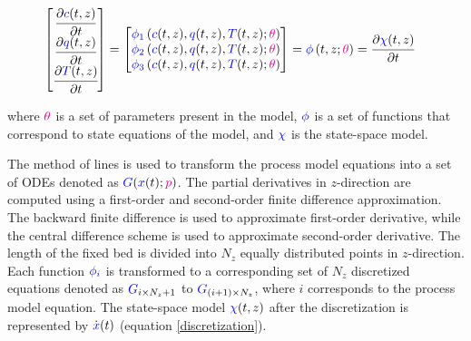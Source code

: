 \documentclass[../Article_Model_Parameters.tex]{subfiles}
\begin{document}
		{\footnotesize
			\begin{align}
				\begin{bmatrix}
					\cfrac{\partial {\color{blue}c}(t,z)}{\partial t}\\
					\cfrac{\partial {\color{blue}q}(t,z)}{\partial t}\\
					\cfrac{\partial {\color{blue}T}(t,z)}{\partial t} 
				\end{bmatrix}
				& =
				\begin{bmatrix}
					{\color{blue}\phi_1} \left( {\color{blue}c}(t,z),{\color{blue}q}(t,z),{\color{blue}T}(t,z); {\color{magenta}\theta} \right)\\
					{\color{blue}\phi_2} \left( {\color{blue}c}(t,z),{\color{blue}q}(t,z),{\color{blue}T}(t,z); {\color{magenta}\theta} \right)\\
					{\color{blue}\phi_3} \left( {\color{blue}c}(t,z),{\color{blue}q}(t,z),{\color{blue}T}(t,z); {\color{magenta}\theta} \right)
				\end{bmatrix} = {\color{blue}\phi} \left( t,z; {\color{magenta}\theta} \right) = \cfrac{\partial {\color{blue}\chi}(t,z)}{\partial t}
		\end{align} }
			
		where ${\color{magenta}\theta}$ is a set of parameters present in the model, ${\color{blue}\phi}$ is a set of functions that correspond to state equations of the model, and ${\color{blue}\chi}$ is the state-space model.
		
		The method of lines is used to transform the process model equations into a set of ODEs denoted as ${\color{blue}G}({\color{blue}x}(t);{\color{magenta}p})$. The partial derivatives in $z$-direction are computed using a first-order and second-order finite difference approximation. The backward finite difference is used to approximate first-order derivative, while the central difference scheme is used to approximate second-order derivative. The length of the fixed bed is divided into $N_z$ equally distributed points in $z$-direction. Each function ${\color{blue}\phi_i}$ is transformed to a corresponding set of $N_z$ discretized equations denoted as ${\color{blue}G}_{i\times N_z+1}$ to ${\color{blue}G}_{(i+1)\times N_z}$, where $i$ corresponds to the process model equation. The state-space model ${\color{blue}\chi}(t,z)$ after the discretization is represented by $\dot{{\color{blue}x}}(t)$ (equation  \ref{discretization}).
			
\end{document}
